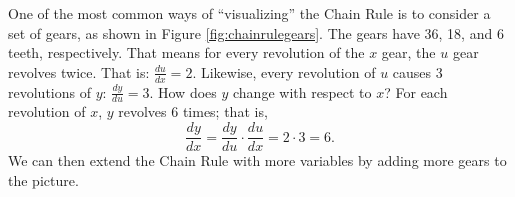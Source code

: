One of the most common ways of 
``visualizing'' the Chain Rule is to consider a set of gears, as shown in Figure \ref{fig:chainrulegears}. The gears have 36, 18, and 6 teeth, respectively. That means for every revolution of the $x$ gear, the $u$ gear revolves twice. That is: $\frac{du}{dx} = 2$. Likewise, every revolution of $u$ causes 3 revolutions of $y$: $\frac{dy}{du} = 3$. How does $y$ change with respect to $x$? For each revolution of $x$, $y$ revolves 6 times; that is, $$\frac{dy}{dx} = \frac{dy}{du}\cdot \frac{du}{dx} = 2\cdot 3 = 6.$$
We can then extend the Chain Rule with more variables by adding more gears to the picture.\\


%


%
